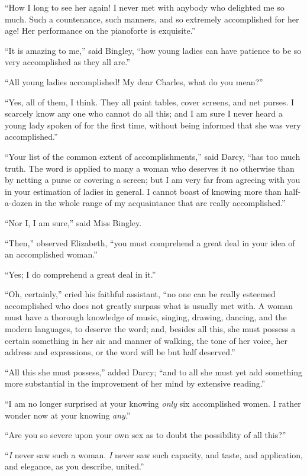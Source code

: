 ``How I long to see her again! I never met with anybody who delighted me so much. Such a countenance, such manners, and so extremely accomplished for her age! Her performance on the pianoforte is exquisite.''

``It is amazing to me,'' said Bingley, ``how young ladies can have patience to be so very accomplished as they all are.''

``All young ladies accomplished! My dear Charles, what do you mean?''

``Yes, all of them, I think. They all paint tables, cover screens, and net purses. I scarcely know any one who cannot do all this; and I am sure I never heard a young lady spoken of for the first time, without being informed that she was very accomplished.''

``Your list of the common extent of accomplishments,'' said Darcy, ``has too much truth. The word is applied to many a woman who deserves it no otherwise than by netting a purse or covering a screen; but I am very far from agreeing with you in your estimation of ladies in general. I cannot boast of knowing more than half-a-dozen in the whole range of my acquaintance that are really accomplished.''

``Nor I, I am sure,'' said Miss Bingley.

``Then,'' observed Elizabeth, ``you must comprehend a great deal in your idea of an accomplished woman.''

``Yes; I do comprehend a great deal in it.''

``Oh, certainly,'' cried his faithful assistant, ``no one can be really esteemed accomplished who does not greatly surpass what is usually met with. A woman must have a thorough knowledge of music, singing, drawing, dancing, and the modern languages, to deserve the word; and, besides all this, she must possess a certain something in her air and manner of walking, the tone of her voice, her address and expressions, or the word will be but half deserved.''

``All this she must possess,'' added Darcy; ``and to all she must yet add something more substantial in the improvement of her mind by extensive reading.''

``I am no longer surprised at your knowing \textit{only} six accomplished women. I rather wonder now at your knowing \textit{any}.''

``Are you so severe upon your own sex as to doubt the possibility of all this?''

``\textit{I} never saw such a woman. \textit{I} never saw such capacity, and taste, and application, and elegance, as you describe, united.''

